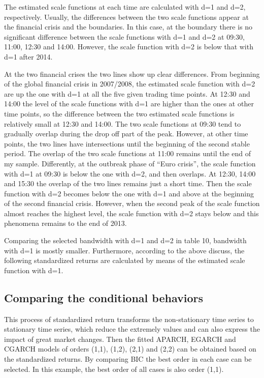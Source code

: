 The estimated scale functions at each time are calculated with d=1 and d=2, respectively. Usually, the differences between the two scale functions appear at the financial crisis and the boundaries. In this case, at the boundary there is no significant difference between the scale functions with d=1 and d=2 at 09:30, 11:00, 12:30 and 14:00. However, the scale function with d=2 is below that with d=1 after 2014. 

At the two financial crises the two lines show up clear differences. From beginning of the global financial crisis in 2007/2008, the estimated scale function with d=2 are up the one with d=1 at all the five given trading time points. At 12:30 and 14:00 the level of the scale functions with d=1 are higher than the ones at other time points, so the difference between the two estimated scale functions is relatively small at 12:30 and 14:00. The two scale functions at 09:30 tend to gradually overlap during the drop off part of the peak. However, at other time points, the two lines have intersections until the beginning of the second stable period. The overlap of the two scale functions at 11:00 remains until the end of my sample. Differently, at the outbreak phase of  ``Euro crisis'', the scale function with d=1 at 09:30 is below the one with d=2, and then overlaps. At 12:30, 14:00 and 15:30 the overlap of the two lines remains just a short time. Then the scale function with d=2 becomes below the one with d=1 and above at the beginning of the second financial crisis. However, when the second peak of the scale function almost reaches the highest level, the scale function with d=2 stays below and this phenomena remains to the end of 2013.

Comparing the selected bandwidth with d=1 and d=2 in table 10, bandwidth with d=1 is mostly smaller. Furthermore, according to the above discuss, the following standardized returns are calculated by means of the estimated scale function with d=1.

\subsection{Comparing the conditional behaviors}

This process of standardized return transforms the non-stationary time series to stationary time series, which reduce the extremely values and can also express the impact of great market changes. Then the fitted APARCH, EGARCH and CGARCH models of orders (1,1), (1,2), (2,1) and (2,2) can be obtained based on the standardized returns. By comparing BIC the best order in each case can be selected. In this example, the best order of all cases is also order (1,1).

